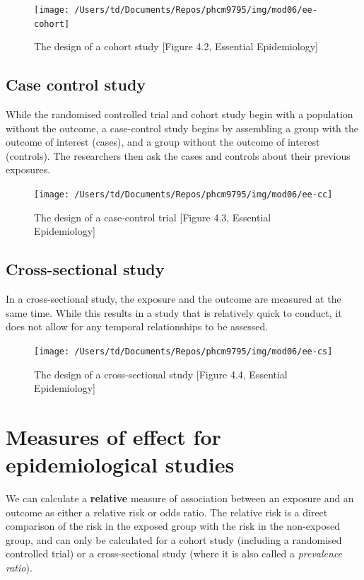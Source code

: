 \documentclass[
]{memoir}
\begin{document}
\begin{figure}
\texttt{[image: /Users/td/Documents/Repos/phcm9795/img/mod06/ee-cohort]} \caption{The design of a cohort study [Figure 4.2, Essential Epidemiology]}\label{fig:ee-fig-cohort}
\end{figure}

\hypertarget{case-control-study}{%
\subsection{Case control study}\label{case-control-study}}

While the randomised controlled trial and cohort study begin with a population without the outcome, a case-control study begins by assembling a group with the outcome of interest (cases), and a group without the outcome of interest (controls). The researchers then ask the cases and controls about their previous exposures.

\begin{figure}
\texttt{[image: /Users/td/Documents/Repos/phcm9795/img/mod06/ee-cc]} \caption{The design of a case-control trial [Figure 4.3, Essential Epidemiology]}\label{fig:ee-fig-cc}
\end{figure}

\hypertarget{cross-sectional-study}{%
\subsection{Cross-sectional study}\label{cross-sectional-study}}

In a cross-sectional study, the exposure and the outcome are measured at the same time. While this results in a study that is relatively quick to conduct, it does not allow for any temporal relationships to be assessed.

\begin{figure}
\texttt{[image: /Users/td/Documents/Repos/phcm9795/img/mod06/ee-cs]} \caption{The design of a cross-sectional study [Figure 4.4, Essential Epidemiology]}\label{fig:ee-fig-cs}
\end{figure}

\hypertarget{measures-of-effect-for-epidemiological-studies}{%
\section{Measures of effect for epidemiological studies}\label{measures-of-effect-for-epidemiological-studies}}

We can calculate a \textbf{relative} measure of association between an exposure and an outcome as either a relative risk or odds ratio. The relative risk is a direct comparison of the risk in the exposed group with the risk in the non-exposed group, and can only be calculated for a cohort study (including a randomised controlled trial) or a cross-sectional study (where it is also called a \emph{prevalence ratio}).
\end{document}

